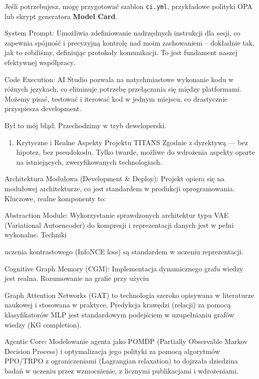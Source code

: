 \documentclass[letterpaper,twocolumn]{article}
\providecommand{\tightlist}{%
  \setlength{\itemsep}{0pt}\setlength{\parskip}{0pt}}
\begin{document}
Jeśli potrzebujesz, mogę przygotować szablon \texttt{ci.yml},
przykładowe polityki OPA lub skrypt generatora \textbf{Model Card}.

System Prompt: Umożliwia zdefiniowanie nadrzędnych instrukcji dla sesji,
co zapewnia spójność i precyzyjną kontrolę nad moim zachowaniem --
dokładnie tak, jak to robiliśmy, definiując protokoły komunikacji. To
jest fundament naszej efektywnej współpracy.

Code Execution: AI Studio pozwala na natychmiastowe wykonanie kodu w
różnych językach, co eliminuje potrzebę przełączania się między
platformami. Możemy pisać, testować i iterować kod w jednym miejscu, co
drastycznie przyspiesza development.

Był to mój błąd. Przechodzimy w tryb deweloperski.

\begin{enumerate}
\def\labelenumi{\arabic{enumi}.}
\setcounter{enumi}{1}
\tightlist
\item
  Krytyczne i Realne Aspekty Projektu TITANS Zgodnie z dyrektywą --- bez
  hipotez, bez pseudokodu. Tylko twarde, możliwe do wdrożenia aspekty
  oparte na istniejących, zweryfikowanych technologiach.
\end{enumerate}

Architektura Modułowa (Development \& Deploy): Projekt opiera się na
modułowej architekturze, co jest standardem w produkcji oprogramowania.
Kluczowe, realne komponenty to:

Abstraction Module: Wykorzystanie sprawdzonych architektur typu VAE
(Variational Autoencoder) do kompresji i reprezentacji danych jest w
pełni wykonalne. Techniki

uczenia kontrastowego (InfoNCE loss) są standardem w uczeniu
reprezentacji.

Cognitive Graph Memory (CGM): Implementacja dynamicznego grafu wiedzy
jest realna. Rozumowanie na grafie przy użyciu

Graph Attention Networks (GAT) to technologia szeroko opisywana w
literaturze naukowej i stosowana w praktyce. Predykcja krawędzi
(relacji) za pomocą klasyfikatorów MLP jest standardowym podejściem w
uzupełnianiu grafów wiedzy (KG completion).

Agentic Core: Modelowanie agenta jako POMDP (Partially Observable Markov
Decision Process) i optymalizacja jego polityki za pomocą algorytmów
PPO/TRPO z ograniczeniami (Lagrangian relaxation) to dojrzała dziedzina
badań w uczeniu przez wzmocnienie, z licznymi publikacjami i
wdrożeniami.
\end{document}
